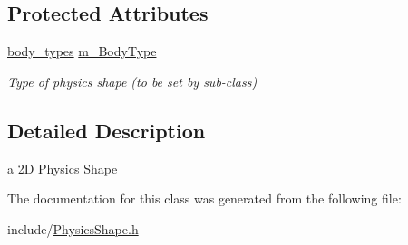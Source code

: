 \subsection*{Protected Attributes}
\begin{DoxyCompactItemize}
\item 
\hypertarget{class_physics_shape_aa22ced89280991e3466292624a2c16a4}{\hyperlink{_physics_shape_8h_a20d894c0e61b699e6a53f0871418ea46}{body\+\_\+types} \hyperlink{class_physics_shape_aa22ced89280991e3466292624a2c16a4}{m\+\_\+\+Body\+Type}}\label{class_physics_shape_aa22ced89280991e3466292624a2c16a4}

\begin{DoxyCompactList}\small\item\em Type of physics shape (to be set by sub-\/class) \end{DoxyCompactList}\end{DoxyCompactItemize}


\subsection{Detailed Description}
a 2\+D Physics Shape 

The documentation for this class was generated from the following file\+:\begin{DoxyCompactItemize}
\item 
include/\hyperlink{_physics_shape_8h}{Physics\+Shape.\+h}\end{DoxyCompactItemize}
